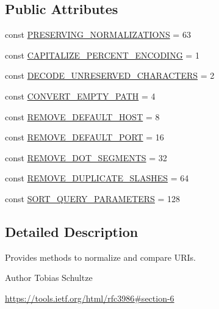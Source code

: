 \subsection*{Public Attributes}
\begin{DoxyCompactItemize}
\item 
const \hyperlink{classGuzzleHttp_1_1Psr7_1_1UriNormalizer_a6a64a4e9fc8e6b71943ae300f1686460}{P\+R\+E\+S\+E\+R\+V\+I\+N\+G\+\_\+\+N\+O\+R\+M\+A\+L\+I\+Z\+A\+T\+I\+O\+NS} = 63
\item 
const \hyperlink{classGuzzleHttp_1_1Psr7_1_1UriNormalizer_afca0131f77bcc9d23a6df99848fa5ffd}{C\+A\+P\+I\+T\+A\+L\+I\+Z\+E\+\_\+\+P\+E\+R\+C\+E\+N\+T\+\_\+\+E\+N\+C\+O\+D\+I\+NG} = 1
\item 
const \hyperlink{classGuzzleHttp_1_1Psr7_1_1UriNormalizer_acedf8393e3f209662798ca302e25017c}{D\+E\+C\+O\+D\+E\+\_\+\+U\+N\+R\+E\+S\+E\+R\+V\+E\+D\+\_\+\+C\+H\+A\+R\+A\+C\+T\+E\+RS} = 2
\item 
const \hyperlink{classGuzzleHttp_1_1Psr7_1_1UriNormalizer_ab4123a1eaa720a392a475125b9bde4c2}{C\+O\+N\+V\+E\+R\+T\+\_\+\+E\+M\+P\+T\+Y\+\_\+\+P\+A\+TH} = 4
\item 
const \hyperlink{classGuzzleHttp_1_1Psr7_1_1UriNormalizer_a185836fe2ddc337a4581a02abc603d8f}{R\+E\+M\+O\+V\+E\+\_\+\+D\+E\+F\+A\+U\+L\+T\+\_\+\+H\+O\+ST} = 8
\item 
const \hyperlink{classGuzzleHttp_1_1Psr7_1_1UriNormalizer_aacb5df77fe58dcf0358d8b69092adced}{R\+E\+M\+O\+V\+E\+\_\+\+D\+E\+F\+A\+U\+L\+T\+\_\+\+P\+O\+RT} = 16
\item 
const \hyperlink{classGuzzleHttp_1_1Psr7_1_1UriNormalizer_a0a143f2499d8ca80b868da19fae75009}{R\+E\+M\+O\+V\+E\+\_\+\+D\+O\+T\+\_\+\+S\+E\+G\+M\+E\+N\+TS} = 32
\item 
const \hyperlink{classGuzzleHttp_1_1Psr7_1_1UriNormalizer_a1071932d3c276775e9a21435d8092f3a}{R\+E\+M\+O\+V\+E\+\_\+\+D\+U\+P\+L\+I\+C\+A\+T\+E\+\_\+\+S\+L\+A\+S\+H\+ES} = 64
\item 
const \hyperlink{classGuzzleHttp_1_1Psr7_1_1UriNormalizer_ac255a421712175a81072304b221428bf}{S\+O\+R\+T\+\_\+\+Q\+U\+E\+R\+Y\+\_\+\+P\+A\+R\+A\+M\+E\+T\+E\+RS} = 128
\end{DoxyCompactItemize}


\subsection{Detailed Description}
Provides methods to normalize and compare U\+R\+Is.

\begin{DoxyAuthor}{Author}
Tobias Schultze
\end{DoxyAuthor}
\hyperlink{}{https\+://tools.\+ietf.\+org/html/rfc3986\#section-\/6}

